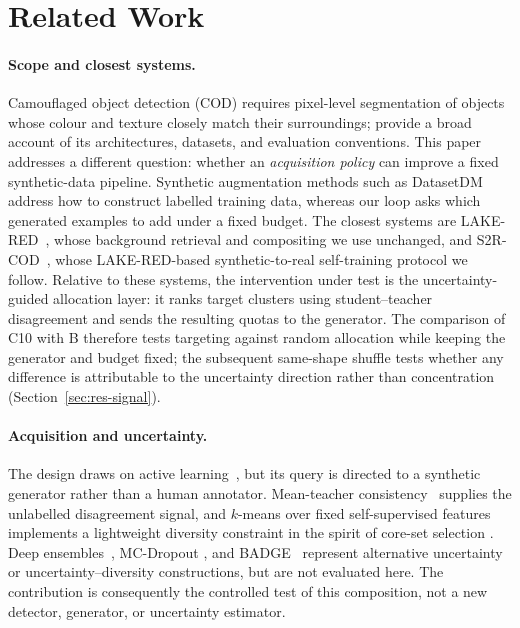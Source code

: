 \documentclass{article} %
\begin{document}
\section{Related Work}
\label{sec:related}

\paragraph{Scope and closest systems.}
Camouflaged object detection (COD) requires pixel-level segmentation of objects whose colour and
texture closely match their surroundings; \citet{fan2023advances} provide a broad account of its
architectures, datasets, and evaluation conventions. This paper addresses a different question:
whether an \emph{acquisition policy} can improve a fixed synthetic-data pipeline. Synthetic
augmentation methods such as DatasetDM~\cite{wu2023datasetdm} address how to construct labelled
training data, whereas our loop asks which generated examples to add under a fixed budget.
The closest systems are LAKE-RED~\cite{zhao2024lakered}, whose background retrieval and
compositing we use unchanged, and S2R-COD~\cite{luo2025s2rcod}, whose LAKE-RED-based
synthetic-to-real self-training protocol we follow. Relative to these systems, the intervention
under test is the uncertainty-guided allocation layer: it ranks target clusters using
student--teacher disagreement and sends the resulting quotas to the generator. The comparison of
C10 with B therefore tests targeting against random allocation while keeping the generator and
budget fixed; the subsequent same-shape shuffle tests whether any difference is attributable to
the uncertainty direction rather than concentration (Section~\ref{sec:res-signal}).

\paragraph{Acquisition and uncertainty.}
The design draws on active learning~\cite{settles2009active}, but its query is directed to a
synthetic generator rather than a human annotator. Mean-teacher consistency~\cite{tarvainen2017mean}
supplies the unlabelled disagreement signal, and $k$-means over fixed self-supervised features
implements a lightweight diversity constraint in the spirit of core-set selection
\cite{sener2018active}. Deep ensembles~\cite{lakshminarayanan2017simple}, MC-Dropout
\cite{gal2016dropout}, and BADGE~\cite{ash2020deep} represent alternative uncertainty or
uncertainty--diversity constructions, but are not evaluated here. The contribution is consequently
the controlled test of this composition, not a new detector, generator, or uncertainty estimator.
\end{document}

